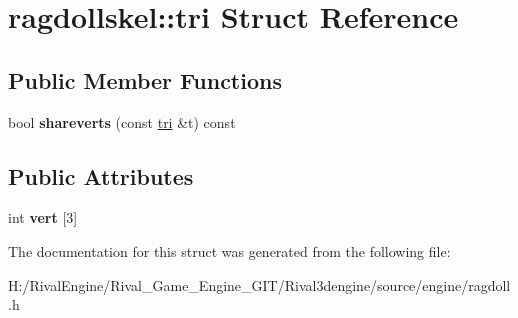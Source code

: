 \hypertarget{structragdollskel_1_1tri}{}\section{ragdollskel\+:\+:tri Struct Reference}
\label{structragdollskel_1_1tri}
\subsection*{Public Member Functions}
\begin{DoxyCompactItemize}
\item 
\mbox{\label{structragdollskel_1_1tri_a96648e477f58a81dddff37d499dcbbd2}} 
bool {\bfseries shareverts} (const \hyperlink{structragdollskel_1_1tri}{tri} \&t) const
\end{DoxyCompactItemize}
\subsection*{Public Attributes}
\begin{DoxyCompactItemize}
\item 
\mbox{\label{structragdollskel_1_1tri_af8b593099e503c995c9e40d3618dea8d}} 
int {\bfseries vert} \mbox{[}3\mbox{]}
\end{DoxyCompactItemize}


The documentation for this struct was generated from the following file\+:\begin{DoxyCompactItemize}
\item 
H\+:/\+Rival\+Engine/\+Rival\+\_\+\+Game\+\_\+\+Engine\+\_\+\+G\+I\+T/\+Rival3dengine/source/engine/ragdoll.\+h\end{DoxyCompactItemize}
